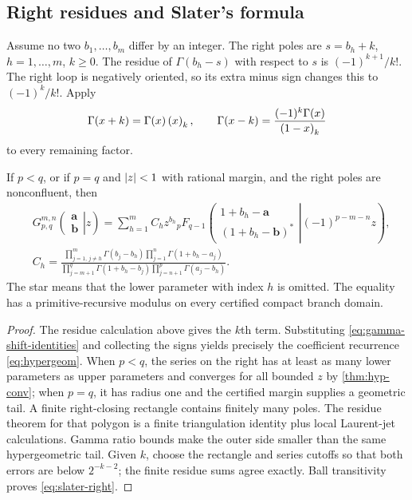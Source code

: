 \subsection{Right residues and Slater's formula}

Assume no two $b_1,\ldots,b_m$ differ by an integer.  The right poles are
$s=b_h+k$, $h=1,\ldots,m$, $k\ge0$.  The residue of
$\Gamma(b_h-s)$ with respect to $s$ is
$(-1)^{k+1}/k!$.  The right loop is negatively oriented, so its extra minus
sign changes this to $(-1)^k/k!$.  Apply
\begin{equation}\label{eq:gamma-shift-identities}
 \Gamma(x+k)=\Gamma(x)\left(x\right)_{k},
 \qquad
 \Gamma(x-k)=\frac{(-1)^k\Gamma(x)}{\left(1-x\right)_{k}}
\end{equation}
to every remaining factor.

\begin{theorem}\label{thm:slater-right}
If $p<q$, or if $p=q$ and $\left|z\right|<1$ with rational margin, and the right poles
are nonconfluent, then
\begin{align}
&G_{p,q}^{m,n}\!\left(\left.\begin{matrix}\mathbf a\\\mathbf b\end{matrix}\right|z\right)
 =\sum_{h=1}^{m}C_h z^{b_h}
 {}_pF_{q-1}\!\left(
 \left.\begin{matrix}1+b_h-\mathbf a\\
 (1+b_h-\mathbf b)^{\!*}
 \end{matrix}\right|(-1)^{p-m-n}z\right),\label{eq:slater-right}\\
&C_h=
 \frac{\prod_{j=1,\,j\ne h}^{m}\Gamma(b_j-b_h)
       \prod_{j=1}^{n}\Gamma(1+b_h-a_j)}
      {\prod_{j=m+1}^{q}\Gamma(1+b_h-b_j)
       \prod_{j=n+1}^{p}\Gamma(a_j-b_h)}.
\end{align}
The star means that the lower parameter with index $h$ is omitted.  The equality
has a primitive-recursive modulus on every certified compact branch domain.
\end{theorem}
\begin{proof}
The residue calculation above gives the $k$th term.  Substituting
\eqref{eq:gamma-shift-identities} and collecting the signs yields precisely the
coefficient recurrence \eqref{eq:hypergeom}.  When $p<q$, the series on the
right has at least as many lower parameters as upper parameters and converges
for all bounded $z$ by \cref{thm:hyp-conv}; when $p=q$, it has radius one and
the certified margin supplies a geometric tail.  A finite right-closing
rectangle contains finitely many poles.  The residue theorem for that polygon
is a finite triangulation identity plus local Laurent-jet calculations.  Gamma
ratio bounds make the outer side smaller than the same hypergeometric tail.
Given $k$, choose the rectangle and series cutoffs so that both errors are below
$2^{-k-2}$; the finite residue sums agree exactly.  Ball transitivity proves
\eqref{eq:slater-right}.
\end{proof}

